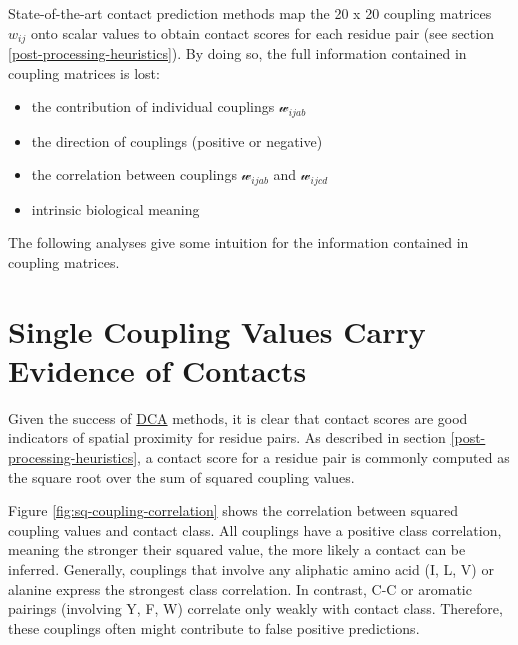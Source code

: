 \documentclass[12pt,a4paper,twoside]{book}
\providecommand{\tightlist}{%
  \setlength{\itemsep}{0pt}\setlength{\parskip}{0pt}}
\newcommand{\wijab}{\mathcal{w}_{ijab}}
\newcommand{\wijcd}{\mathcal{w}_{ijcd}}
\theoremstyle{definition}
\theoremstyle{definition}
\theoremstyle{remark}
\begin{document}
State-of-the-art contact prediction methods map the 20 x 20 coupling
matrices \(w_{ij}\) onto scalar values to obtain contact scores for each
residue pair (see section \ref{post-processing-heuristics}). By doing
so, the full information contained in coupling matrices is lost:

\begin{itemize}
\tightlist
\item
  the contribution of individual couplings \(\wijab\)
\item
  the direction of couplings (positive or negative)
\item
  the correlation between couplings \(\wijab\) and \(\wijcd\)
\item
  intrinsic biological meaning
\end{itemize}

The following analyses give some intuition for the information contained
in coupling matrices.

\section{Single Coupling Values Carry Evidence of
Contacts}\label{single-coupling-values-carry-evidence-of-contacts}

Given the success of \protect\hyperlink{abbrev}{DCA} methods, it is
clear that contact scores are good indicators of spatial proximity for
residue pairs. As described in section \ref{post-processing-heuristics},
a contact score for a residue pair is commonly computed as the square
root over the sum of squared coupling values.

Figure \ref{fig:sq-coupling-correlation} shows the correlation between
squared coupling values and contact class. All couplings have a positive
class correlation, meaning the stronger their squared value, the more
likely a contact can be inferred. Generally, couplings that involve any
aliphatic amino acid (I, L, V) or alanine express the strongest class
correlation. In contrast, C-C or aromatic pairings (involving Y, F, W)
correlate only weakly with contact class. Therefore, these couplings
often might contribute to false positive predictions.
\end{document}
